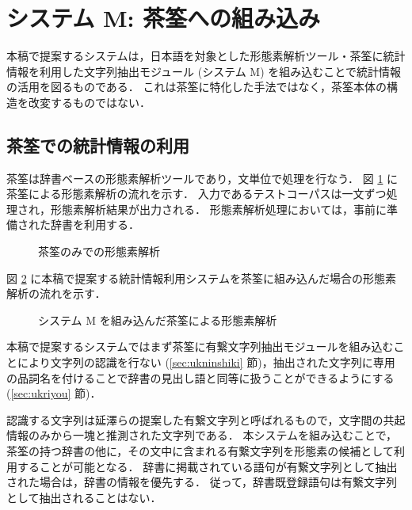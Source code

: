\section{システム M: 茶筌への組み込み}
本稿で提案するシステムは，日本語を対象とした形態素解析ツール・茶筌に統計情報を利用した文字列抽出モジュール (システム M) を組み込むことで統計情報の活用を図るものである．
これは茶筌に特化した手法ではなく，茶筌本体の構造を改変するものではない．
\subsection{茶筌での統計情報の利用}
茶筌は辞書ベースの形態素解析ツールであり，文単位で処理を行なう．
図 \ref{fig:flo-o} に茶筌による形態素解析の流れを示す．
入力であるテストコーパスは一文ずつ処理され，形態素解析結果が出力される．
形態素解析処理においては，事前に準備された辞書を利用する．
\begin{figure}[hbt]
\begin{center}
\caption{茶筌のみでの形態素解析}
\label{fig:flo-o}
\end{center}
\end{figure}

図 \ref{fig:flo-m} に本稿で提案する統計情報利用システムを茶筌に組み込んだ場合の形態素解析の流れを示す．
\begin{figure}[hbt]
\begin{center}
\caption{システム M を組み込んだ茶筌による形態素解析}
\label{fig:flo-m}
\end{center}
\end{figure}
本稿で提案するシステムではまず茶筌に有繋文字列抽出モジュールを組み込むことにより文字列の認識を行ない (\ref{sec:ukninshiki} 節)，抽出された文字列に専用の品詞名を付けることで辞書の見出し語と同等に扱うことができるようにする (\ref{sec:ukriyou} 節)．

認識する文字列は延澤らの提案した有繋文字列\cite{nobesawa96coling}と呼ばれるもので，文字間の共起情報のみから一塊と推測された文字列である．
本システムを組み込むことで，茶筌の持つ辞書の他に，その文中に含まれる有繋文字列を形態素の候補として利用することが可能となる．
辞書に掲載されている語句が有繋文字列として抽出された場合は，辞書の情報を優先する．
従って，辞書既登録語句は有繋文字列として抽出されることはない．
